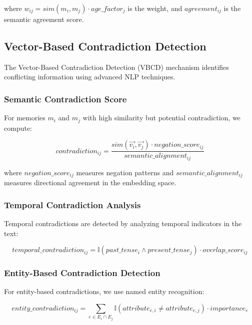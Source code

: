 \documentclass[12pt,a4paper]{article}
\begin{document}
where $w_{ij} = sim(m_i, m_j) \cdot age\_factor_j$ is the weight, and $agreement_{ij}$ is the semantic agreement score.

\subsection{Vector-Based Contradiction Detection}

The Vector-Based Contradiction Detection (VBCD) mechanism identifies conflicting information using advanced NLP techniques.

\subsubsection{Semantic Contradiction Score}

For memories $m_i$ and $m_j$ with high similarity but potential contradiction, we compute:

\begin{equation}
contradiction_{ij} = \frac{sim(\vec{v_i}, \vec{v_j}) \cdot negation\_score_{ij}}{semantic\_alignment_{ij}}
\end{equation}

where $negation\_score_{ij}$ measures negation patterns and $semantic\_alignment_{ij}$ measures directional agreement in the embedding space.

\subsubsection{Temporal Contradiction Analysis}

Temporal contradictions are detected by analyzing temporal indicators in the text:

\begin{equation}
temporal\_contradiction_{ij} = \mathbb{I}(past\_tense_i \land present\_tense_j) \cdot overlap\_score_{ij}
\end{equation}

\subsubsection{Entity-Based Contradiction Detection}

For entity-based contradictions, we use named entity recognition:

\begin{equation}
entity\_contradiction_{ij} = \sum_{e \in E_i \cap E_j} \mathbb{I}(attribute_{e,i} \neq attribute_{e,j}) \cdot importance_e
\end{equation}
\end{document}

